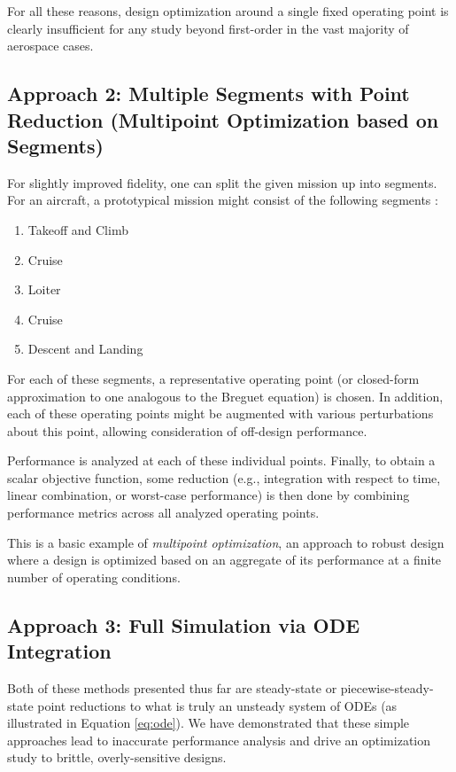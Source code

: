 For all these reasons, design optimization around a single fixed operating point is clearly insufficient for any study beyond first-order in the vast majority of aerospace cases.


\subsection{Approach 2: Multiple Segments with Point Reduction (Multipoint Optimization based on Segments)}

For slightly improved fidelity, one can split the given mission up into segments. For an aircraft, a prototypical mission might consist of the following segments \cite{raymer}:

\begin{enumerate}[noitemsep]
    \item Takeoff and Climb
    \item Cruise
    \item Loiter
    \item Cruise
    \item Descent and Landing
\end{enumerate}

For each of these segments, a representative operating point (or closed-form approximation to one analogous to the Breguet equation) is chosen. In addition, each of these operating points might be augmented with various perturbations about this point, allowing consideration of off-design performance.

Performance is analyzed at each of these individual points. Finally, to obtain a scalar objective function, some reduction (e.g., integration with respect to time, linear combination, or worst-case performance) is then done by combining performance metrics across all analyzed operating points.

This is a basic example of \textit{multipoint optimization}, an approach to robust design where a design is optimized based on an aggregate of its performance at a finite number of operating conditions.


\subsection{Approach 3: Full Simulation via ODE Integration}
\label{sect:dynamics-ode}

Both of these methods presented thus far are steady-state or piecewise-steady-state point reductions to what is truly an unsteady system of ODEs (as illustrated in Equation \ref{eq:ode}). We have demonstrated that these simple approaches lead to inaccurate performance analysis and drive an optimization study to brittle, overly-sensitive designs.

